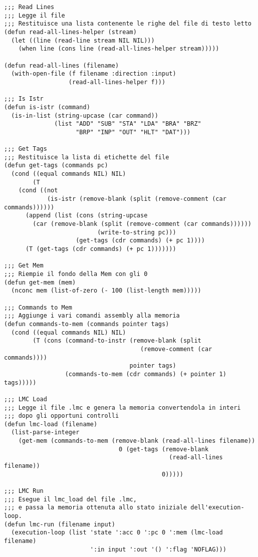 \documentclass[a4paper,12pt, oneside]{book}
\begin{document}
\begin{verbatim}
;;; Read Lines
;;; Legge il file
;;; Restituisce una lista contenente le righe del file di testo letto
(defun read-all-lines-helper (stream)
  (let ((line (read-line stream NIL NIL))) 
    (when line (cons line (read-all-lines-helper stream)))))

(defun read-all-lines (filename)
  (with-open-file (f filename :direction :input)
                  (read-all-lines-helper f)))

;;; Is Istr
(defun is-istr (command)
  (is-in-list (string-upcase (car command)) 
              (list "ADD" "SUB" "STA" "LDA" "BRA" "BRZ" 
                    "BRP" "INP" "OUT" "HLT" "DAT")))

;;; Get Tags
;;; Restituisce la lista di etichette del file
(defun get-tags (commands pc)
  (cond ((equal commands NIL) NIL)
        (T 
    (cond ((not 
            (is-istr (remove-blank (split (remove-comment (car commands)))))) 
      (append (list (cons (string-upcase 
        (car (remove-blank (split (remove-comment (car commands)))))) 
                          (write-to-string pc))) 
                    (get-tags (cdr commands) (+ pc 1))))
      (T (get-tags (cdr commands) (+ pc 1)))))))

;;; Get Mem
;;; Riempie il fondo della Mem con gli 0 
(defun get-mem (mem)
  (nconc mem (list-of-zero (- 100 (list-length mem)))))

;;; Commands to Mem
;;; Aggiunge i vari comandi assembly alla memoria
(defun commands-to-mem (commands pointer tags)
  (cond ((equal commands NIL) NIL)
        (T (cons (command-to-instr (remove-blank (split 
                                      (remove-comment (car commands)))) 
                                   pointer tags)
                 (commands-to-mem (cdr commands) (+ pointer 1) tags)))))

;;; LMC Load
;;; Legge il file .lmc e genera la memoria convertendola in interi
;;; dopo gli opportuni controlli 
(defun lmc-load (filename)
  (list-parse-integer 
    (get-mem (commands-to-mem (remove-blank (read-all-lines filename)) 
                                0 (get-tags (remove-blank 
                                              (read-all-lines filename)) 
                                            0)))))

;;; LMC Run
;;; Esegue il lmc_load del file .lmc,
;;; e passa la memoria ottenuta allo stato iniziale dell'execution-loop.
(defun lmc-run (filename input)
  (execution-loop (list 'state ':acc 0 ':pc 0 ':mem (lmc-load filename)
                        ':in input ':out '() ':flag 'NOFLAG)))
\end{verbatim}
\end{document}
